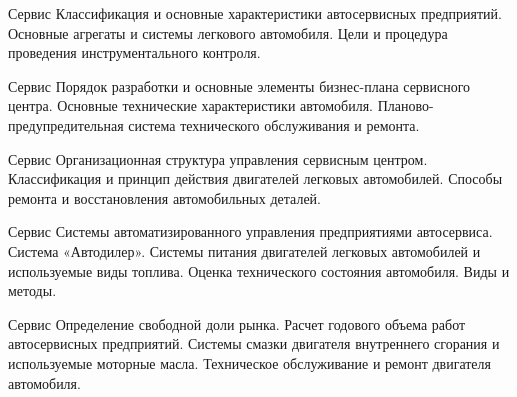 \documentclass[
	11pt,
	a4paper,
	]
	{article}
\begin{document}
	

\begin{minipage}[t][\miniH]{\miniL}\centering
	 {Сервис}
		{
			Классификация и основные характеристики автосервисных предприятий.
		}{
			Основные агрегаты и системы легкового автомобиля.
		}{
			Цели и процедура проведения инструментального контроля.
		}
	\lowGE
\end{minipage}

\vfill



\begin{minipage}[t][\miniH]{\miniL}\centering
	 {Сервис}
		{
			Порядок разработки и основные элементы бизнес-плана сервисного центра.
		}{
			Основные технические характеристики автомобиля.
		}{
			Планово-предупредительная система технического обслуживания и ремонта.
		}
	\lowGE
\end{minipage}

\vfill



\begin{minipage}[t][\miniH]{\miniL}\centering
	 {Сервис}
		{
			Организационная структура управления сервисным центром.
		}{
			Классификация и принцип действия двигателей легковых автомобилей.
		}{
			Способы ремонта и восстановления автомобильных деталей.
		}
	\lowGE
\end{minipage}





\begin{minipage}[t][\miniH]{\miniL}\centering
	 {Сервис}
		{
			Системы автоматизированного управления предприятиями автосервиса. Система «Автодилер».
		}{
			Системы питания двигателей легковых автомобилей и используемые виды топлива.
		}{
			Оценка технического состояния автомобиля. Виды и методы.
		}
	\lowGE
\end{minipage}

\vfill



\begin{minipage}[t][\miniH]{\miniL}\centering
	 {Сервис}
		{
			Определение свободной доли рынка. Расчет годового объема работ автосервисных предприятий.
		}{
			Системы смазки двигателя внутреннего сгорания и используемые моторные масла.
		}{
			Техническое обслуживание и ремонт двигателя автомобиля.
		}
	\lowGE
\end{minipage}
\end{document}
